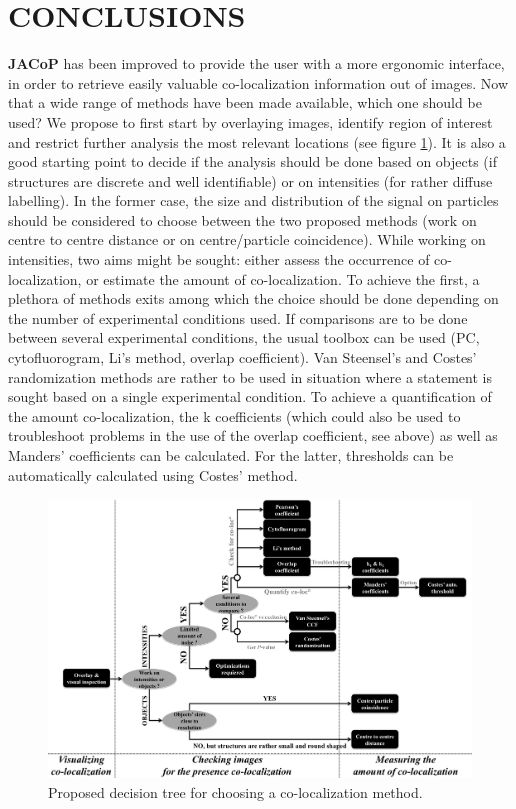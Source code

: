 \documentclass[]{spie}  %
\begin{document}
\section{CONCLUSIONS}
\label{sec:Conclusion}
\textbf{JACoP} has been improved to provide the user with a more ergonomic interface, in order to retrieve easily valuable co-localization information out of images. Now that a wide range of methods have been made available, which one should be used? We propose to first start by overlaying images, identify region of interest and restrict further analysis the most relevant locations (see figure \ref{fig:DecisionTree}). It is also a good starting point to decide if the analysis should be done based on objects (if structures are discrete and well identifiable) or on intensities (for rather diffuse labelling). In the former case, the size and distribution of the signal on particles should be considered to choose between the two proposed methods (work on centre to centre distance or on centre/particle coincidence). While working on intensities, two aims might be sought: either assess the occurrence of co-localization, or estimate the amount of co-localization. To achieve the first, a plethora of methods exits among which the choice should be done depending on the number of experimental conditions used. If comparisons are to be done between several experimental conditions, the usual toolbox can be used (PC, cytofluorogram, Li's method, overlap coefficient). Van Steensel's and Costes' randomization methods are rather to be used in situation where a statement is sought based on a single experimental condition. To achieve a quantification of the amount co-localization, the k coefficients (which could also be used to troubleshoot problems in the use of the overlap coefficient, see above) as well as Manders' coefficients can be calculated. For the latter, thresholds can be automatically calculated using Costes' method.
\begin{figure}[!ht]
\begin{center}
\includegraphics[width=0.85\linewidth]{figs/DecisionTree.png}
\end{center}
\caption[DecisionTree] 
{ \label{fig:DecisionTree} 
Proposed decision tree for choosing a co-localization method.}
 \end{figure} 
\end{document}

